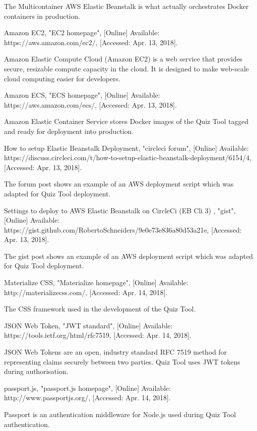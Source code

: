 \documentclass[11pt,a4paper]{report}
\begin{document}
\begin{thebibliography}{1}
    The Multicontainer AWS Elastic Beanstalk is what actually orchestrates Docker containers in production.

 Amazon EC2, "EC2 homepage", [Online] Available: https://aws.amazon.com/ec2/, [Accessed: Apr. 13, 2018].

    Amazon Elastic Compute Cloud (Amazon EC2) is a web service that provides secure, resizable compute capacity in the cloud. It is designed to make web-scale cloud computing easier for developers.

 Amazon ECS, "ECS homepage", [Online] Available: https://aws.amazon.com/ecs/, [Accessed: Apr. 13, 2018].

    Amazon Elastic Container Service stores Docker images of the Quiz Tool tagged and ready for deployment into production.

 How to setup Elastic Beanstalk Deployment, "circleci forum", [Online] Available: https://discuss.circleci.com/t/how-to-setup-elastic-beanstalk-deployment/6154/4, [Accessed: Apr. 13, 2018].

    The forum post shows an example of an AWS deployment script which was adapted for Quiz Tool deployment.

 Settings to deploy to AWS Elastic Beanstalk on CircleCi (EB Cli 3) , "gist", [Online] Available: https://gist.github.com/RobertoSchneiders/9e0e73e836a80d53a21e, [Accessed: Apr. 13, 2018].

    The gist post shows an example of an AWS deployment script which was adapted for Quiz Tool deployment.

 Materialize CSS, "Materialize homepage", [Online] Available: http://materializecss.com/, [Accessed: Apr. 14, 2018].

    The CSS framework used in the development of the Quiz Tool.

 JSON Web Token, "JWT standard", [Online] Available: https://tools.ietf.org/html/rfc7519, [Accessed: Apr. 14, 2018].

  JSON Web Tokens are an open, industry standard RFC 7519 method for representing claims securely between two parties. Quiz Tool
  uses JWT tokens during authorisation.

 passport.js, "passport.js homepage", [Online] Available: http://www.passportjs.org/, [Accessed: Apr. 14, 2018].

  Passport is an authentication middleware for Node.js used during Quiz Tool authentication.


\end{thebibliography}
\end{document}
